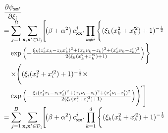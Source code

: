 \documentclass[conference]{IEEEtran}
\begin{document}
	\begin{equation*}
		\hspace{-1.7mm}
		\begin{array}{l}
			\displaystyle\dfrac{\partial\psi_\mathbf{zz^\prime}}{\partial\xi_i}\\
			\displaystyle=\sum\limits_{j=1}^{B}\sum\limits_{\mathbf{x},\mathbf{x}^\prime\in\mathcal{D}_j}\hspace{-0.5mm}\Biggl[\hspace{-0.5mm}\left(\beta+\alpha^2\right) c^{j}_{\mathbf{x}\mathbf{x}^\prime}\prod_{k\neq i}\Bigg\{(\xi_k(x_{k}^2+x_{k}^{\prime2})+1)^{-\frac{1}{2}}\\
			\quad\exp\left(-\frac{\xi_k(z^\prime_{k}x_{k}-z_{k}x^\prime_{k})^2+(x_{k}\nu_k-z_{k})^2+(x^\prime_{k}\nu_k-z^\prime_{k})^2}{2(\xi_k(x_{k}^2+x_{k}^{\prime 2})+1)}\right)\hspace{-0.5mm}\Bigg\}\\
			\quad\times\Biggl((\xi_i(x_{i}^2+x_{i}^{\prime2})+1)^{-\frac{1}{2}}\times\\
			\quad \exp\left(-\frac{\xi_i(z^\prime_{i}x_{i}-z_{i}x^\prime_{i})^2+(x_{i}\nu_i-z_{i})^2+(x^\prime_{i}\nu_i-z^\prime_{i})^2}{2(\xi_i(x_{i}^2+x_{i}^{\prime 2})+1)}\right)\Biggr)^\prime\Biggr]\\
			\displaystyle=\sum\limits_{j=1}^{B}\sum\limits_{\mathbf{x},\mathbf{x}^\prime\in\mathcal{D}_j}\hspace{-0.5mm}\Biggl[\hspace{-0.5mm}\left(\beta+\alpha^2\right) c^{j}_{\mathbf{x}\mathbf{x}^\prime}\prod_{k=1}^{d}\Bigg\{(\xi_k(x_{k}^2+x_{k}^{\prime2})+1)^{-\frac{1}{2}}\\

\end{array}
\end{equation*}
\end{document}
